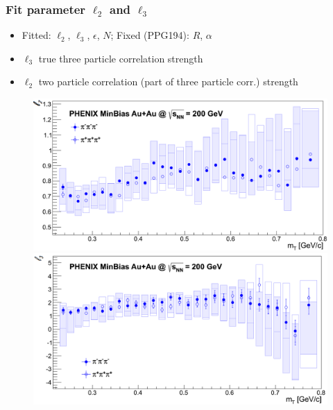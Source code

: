 \documentclass{beamer}
\begin{document}
\begin{frame}
\frametitle{Fit parameter $\ell_2$ and $\ell_3$}
\begin{minipage}{.38\textwidth}
\begin{itemize}
\setlength{\itemsep}{20pt}
\item Fitted: $\ell_2$, $\ell_3$, $\epsilon$, $N$; Fixed (PPG194): $R$, $\alpha$
\item $\ell_3$ true three particle correlation strength
\item $\ell_2$ two particle correlation (part of three particle corr.) strength
\end{itemize}
\end{minipage}
\begin{minipage}{.61\textwidth}
\begin{figure}
\includegraphics[scale=0.25]{pic/l2}\\
\includegraphics[scale=0.25]{pic/l3}
\end{figure}
\end{minipage}

\end{frame}
\end{document}
